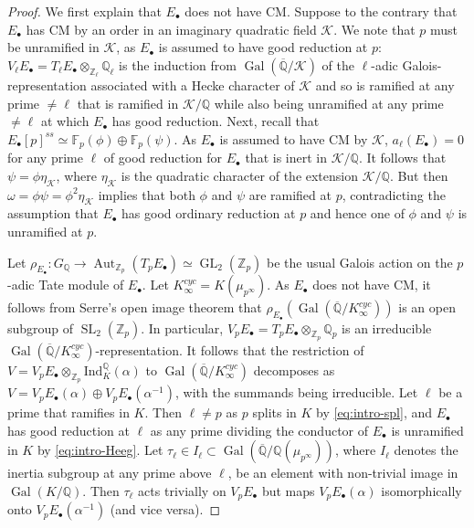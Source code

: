 \documentclass[a4paper,10pt]{amsart}
\numberwithin{equation}{section}
\numberwithin{equation}{section}
\theoremstyle{plain}
\theoremstyle{definition}
\theoremstyle{definition}
\theoremstyle{plain}
\theoremstyle{plain}
\theoremstyle{plain}
\theoremstyle{plain}
\newcommand{\Gal}{\operatorname{Gal}}
\newcommand{\Z}{\mathbb{Z}}
\newcommand{\Q}{\mathbb{Q}}
\newcommand{\Qp}{\mathbb{Q}_{p}}
\newcommand{\Zp}{\mathbb{Z}_{p}}
\DeclareMathOperator{\SL}{SL}
\DeclareMathOperator{\GL}{GL}
\DeclareMathOperator{\Aut}{Aut}
\begin{document}
\begin{proof}
{We first explain that $E_\bullet$ does not have CM. Suppose to the contrary that $E_\bullet$ has CM by an order
in an imaginary quadratic field $\mathcal{K}$. We note that $p$ must be unramified in $\mathcal{K}$, as $E_\bullet$ is assumed to have good reduction at $p$:
$V_\ell E_\bullet = T_\ell E_\bullet\otimes_{\Z_\ell}{\Q_\ell}$ is the induction from $\Gal(\overline{\Q}/\mathcal{K})$ of the $\ell$-adic Galois-representation associated
with a Hecke character of $\mathcal{K}$ and so is ramified at any prime $\neq\ell$ that is ramified in $\mathcal{K}/\Q$ while also being unramified
at any prime $\neq\ell$ at which $E_\bullet$ has good reduction. 
Next, recall that $E_\bullet[p]^{ss} \simeq \mathbb{F}_p(\phi)\oplus \mathbb{F}_p(\psi)$.  As $E_\bullet$ is assumed to have CM by $\mathcal{K}$, $a_\ell(E_\bullet)=0$ for any prime $\ell$ 
of good reduction for $E_\bullet$ that is inert in $\mathcal{K}/\Q$. It follows that $\psi = \phi\eta_{\mathcal{K}}$, where $\eta_\mathcal{K}$ is the quadratic character of the extension
$\mathcal{K}/\Q$. But then $\omega = \phi\psi = \phi^2\eta_{\mathcal{K}}$ implies that both $\phi$ and $\psi$ are ramified at $p$, contradicting the assumption
that $E_\bullet$ has good ordinary reduction at $p$ and hence one of $\phi$ and $\psi$ is unramified at $p$.

Let $\rho_{E_\bullet}:G_\Q\rightarrow\Aut_{\Zp}(T_pE_\bullet) \simeq \GL_2(\Zp)$ be the usual Galois action on the $p$-adic Tate module of $E_\bullet$.  
Let $K_\infty^{cyc} = K(\mu_{p^\infty})$. As $E_\bullet$ does not have CM, it follows from Serre's open image theorem 
that $\rho_{E_\bullet}(\Gal(\overline{\Q}/K_\infty^{cyc}))$ is an open subgroup of $\SL_2(\Zp)$. In particular, 
$V_pE_\bullet = T_pE_\bullet\otimes_{\Zp}\Qp$ is an irreducible $\Gal(\overline{\Q}/K_\infty^{cyc})$-representation.
It follows that the restriction of $V = V_pE_\bullet \otimes_{\Zp}{\mathrm{Ind}}_K^\Q(\alpha)$ to $\Gal(\overline{\Q}/K_\infty^{cyc})$
decomposes as $V = V_pE_\bullet(\alpha) \oplus V_pE_\bullet(\alpha^{-1})$, with the summands being irreducible.
Let $\ell$ be a prime that ramifies in $K$. Then $\ell\neq p$ as $p$ splits in $K$ by \eqref{eq:intro-spl}, and $E_\bullet$ has good reduction at $\ell$ 
as any prime dividing the conductor of $E_\bullet$ is unramified in $K$ by \eqref{eq:intro-Heeg}.  
Let $\tau_\ell\in I_\ell \subset \Gal(\overline{\Q}/\Q(\mu_{p^\infty}))$, where $I_\ell$ denotes the inertia subgroup at any prime above $\ell$, be an element with non-trivial image in $\Gal(K/\Q)$. 
Then $\tau_\ell$ acts trivially on $V_pE_\bullet$ but maps $V_pE_\bullet(\alpha)$ isomorphically onto $V_pE_\bullet(\alpha^{-1})$ 
(and vice versa). 

}
\end{proof}
\end{document}
